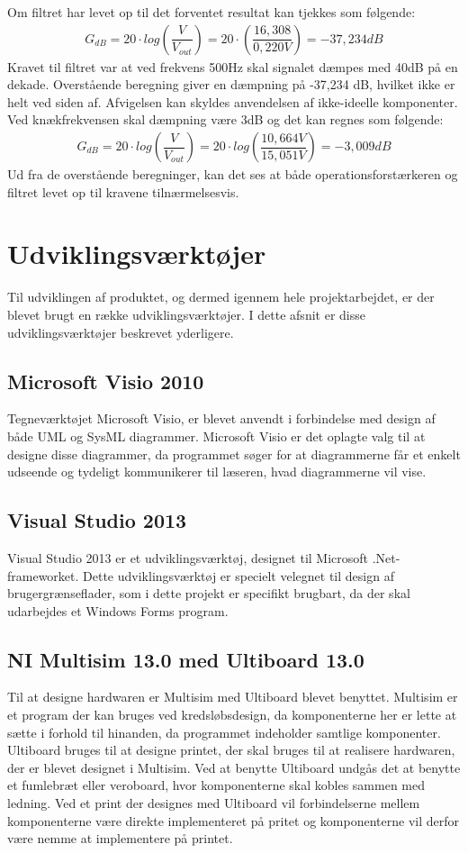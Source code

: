 Om filtret har levet op til det forventet resultat kan tjekkes som følgende:
\begin{align}
G_{dB}=20\cdot log\left(\dfrac{V}{V_{out}}\right)=20\cdot \left(\dfrac{16,308}{0,220V}\right)=-37,234dB
\end{align}
Kravet til filtret var at ved frekvens 500Hz skal signalet dæmpes med 40dB på en dekade. Overstående beregning giver en dæmpning på -37,234 dB, hvilket ikke er helt ved siden af. Afvigelsen kan skyldes anvendelsen af ikke-ideelle komponenter. \\
Ved knækfrekvensen skal dæmpning være 3dB og det kan regnes som følgende: 
\begin{align}
G_{dB}=20\cdot log\left(\dfrac{V}{V_{out}}\right) = 20\cdot log\left(\dfrac{10,664V}{15,051V}\right)=-3,009dB
\end{align}
Ud fra de overstående beregninger, kan det ses  at både operationsforstærkeren og filtret levet op til kravene tilnærmelsesvis. 
\section{Udviklingsværktøjer}
Til udviklingen af produktet, og dermed igennem hele projektarbejdet, er der blevet brugt en række udviklingsværktøjer. I dette afsnit er disse udviklingsværktøjer beskrevet yderligere.
\subsection{Microsoft Visio 2010}
Tegneværktøjet Microsoft Visio, er blevet anvendt i forbindelse med design af både UML og SysML diagrammer. Microsoft Visio er det oplagte valg til at designe disse diagrammer, da programmet søger for at diagrammerne får et enkelt udseende og tydeligt kommunikerer til læseren, hvad diagrammerne vil vise.
\subsection{Visual Studio 2013}
Visual Studio 2013 er et udviklingsværktøj, designet til Microsoft .Net-frameworket. Dette udviklingsværktøj er specielt velegnet til design af brugergrænseflader, som i dette projekt er specifikt brugbart, da der skal udarbejdes et Windows Forms program.
\subsection{NI Multisim 13.0 med Ultiboard 13.0}
Til at designe hardwaren er Multisim med Ultiboard blevet benyttet. Multisim er et program der kan bruges ved kredsløbsdesign, da komponenterne her er lette at sætte i forhold til hinanden, da programmet indeholder samtlige komponenter. Ultiboard bruges til at designe printet, der skal bruges til at realisere hardwaren, der er blevet designet i Multisim. Ved at benytte Ultiboard undgås det at benytte et fumlebræt eller veroboard, hvor komponenterne skal kobles sammen med ledning. Ved et print der designes med Ultiboard vil forbindelserne mellem komponenterne være direkte implementeret på pritet og komponenterne vil derfor være nemme at implementere på printet.
